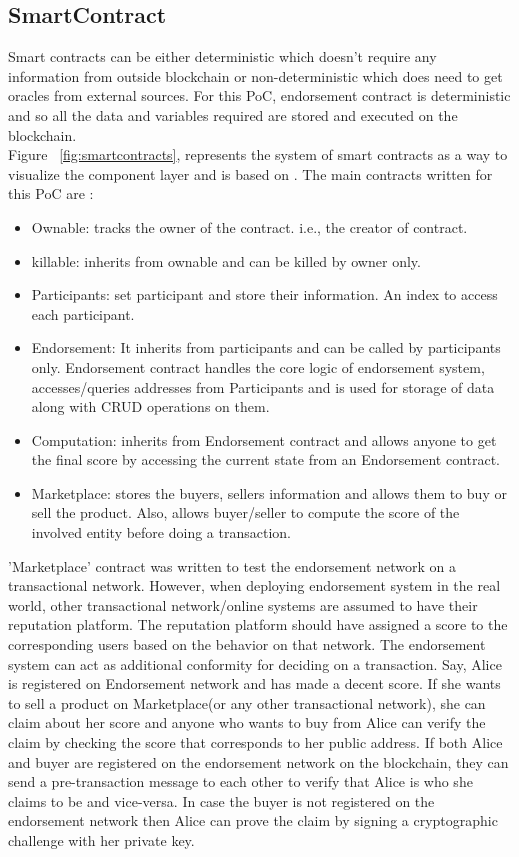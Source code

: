 \subsection{SmartContract} 
Smart contracts can be either deterministic which doesn't require any
information from outside blockchain or non-deterministic which does need to get
oracles from external sources\cite{alharby2017blockchain}. For this PoC,
endorsement contract is deterministic and so all the data and variables
required are stored and executed on the blockchain. \\
Figure ~\ref{fig:smartcontracts}, represents the system of smart contracts as a
way to visualize the component layer and is based on \cite{delmolino2016step}. 
The main contracts written for this PoC are : 
\begin{itemize}
	\item Ownable: tracks the owner of the contract. i.e., the creator of
		contract. 
	\item killable: inherits from ownable and can be killed by owner only. 
	\item Participants: set participant and store their information. An index
		to access each participant. 
	\item Endorsement: It inherits from participants and can be called by
		participants only. Endorsement contract handles the core logic of
		endorsement system, accesses/queries addresses from Participants and is
		used for storage of data along with CRUD operations on them.  
	\item Computation: inherits from Endorsement contract and allows anyone to
		get the final score by accessing the current state from an Endorsement
		contract.
	\item Marketplace: stores the buyers, sellers information and allows them
		to buy or sell the product. Also, allows buyer/seller to compute the
		score of the involved entity before doing a transaction.  
\end{itemize}

'Marketplace' contract was written to test the endorsement network on a
transactional network. However, when deploying endorsement system in the real
world, other transactional network/online systems are assumed to have their
reputation platform. The reputation platform should have assigned a score to
the corresponding users based on the behavior on that network. The endorsement
system can act as additional conformity for deciding on a transaction. Say,
Alice is registered on Endorsement network and has made a decent score. If she
wants to sell a product on Marketplace(or any other transactional network), she
can claim about her score and anyone who wants to buy from Alice can verify the
claim by checking the score that corresponds to her public address. If both
Alice and buyer are registered on the endorsement network on the blockchain,
they can send a pre-transaction message to each other to verify that Alice is
who she claims to be and vice-versa. In case the buyer is not registered on the
endorsement network then Alice can prove the claim by signing a cryptographic
challenge with her private key. 

